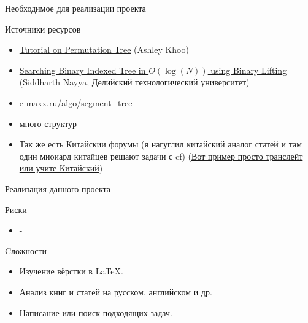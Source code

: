 \documentclass[8pt]{beamer}%
\begin{document}
\begin{frame}{Необходимое для реализации проекта}
\begin{block}{Источники ресурсов}
\begin{itemize}
				\item \href{https://codeforces.com/blog/entry/78898}{Tutorial on Permutation Tree} (Ashley Khoo)
				
				\item \href{https://codeforces.com/blog/entry/61364}{Searching Binary Indexed Tree in $O( \log(N))$ using Binary Lifting} (Siddharth Nayya, Делийский технологический университет)
				
				\item \href{https://e-maxx.ru/algo/segment_tree}{e-maxx.ru/algo/segment\_tree}
				
				\item \href{https://codeforces.com/blog/entry/15729}{много структур}
				
				\item Так же есть Китайскии форумы (я нагуглил китайский аналог статей и там один миоиард китайцев решают задачи с cf) (\href{https://blog.csdn.net/weixin_43826249/article/details/102600666}{Вот пример просто транслейт или учите Китайский})
				
			\end{itemize}
		\end{block}
		
		
	\end{frame}





	\begin{frame}{Реализация данного проекта}
		\begin{block}{Риски}
			\begin{itemize}
				\item -
			\end{itemize}
		\end{block}
		
		\begin{block}{Cложности}
			\begin{itemize}
				\item Изучение вёрстки в \LaTeX.
				\item Анализ книг и статей на русском, английском и др.
				\item Написание или поиск подходящих задач.
			\end{itemize}
		\end{block}
	\end{frame}
\end{document}
